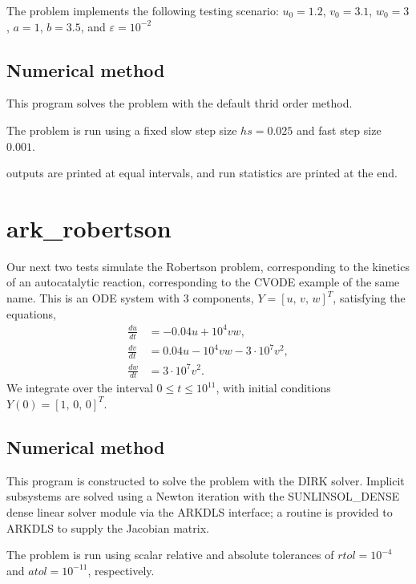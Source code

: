 \documentclass[letterpaper,10pt,english]{sphinxmanual}
\begin{document}
\sphinxAtStartPar
The problem implements the following testing scenario: \(u_0=1.2\),
\(v_0=3.1\),  \(w_0=3\), \(a=1\), \(b=3.5\), and
\(\varepsilon=10^{-2}\)


\subsection{Numerical method}
\label{\detokenize{c_serial:id11}}
\sphinxAtStartPar
This program solves the problem with the default thrid order method.

\sphinxAtStartPar
The problem is run using a fixed slow step size \(hs=0.025\) and fast step
size \(0.001\).

 outputs are printed at equal intervals, and run statistics
are printed at the end.


\section{ark\_robertson}
\label{\detokenize{c_serial:ark-robertson}}\label{\detokenize{c_serial:id12}}
\sphinxAtStartPar
Our next two tests simulate the Robertson problem, corresponding to the
kinetics of an autocatalytic reaction, corresponding to the CVODE
example of the same name.  This is an ODE system with 3
components, \(Y = [u,\, v,\, w]^T\), satisfying the equations,
\begin{equation*}
\begin{split}\frac{du}{dt} &= -0.04 u + 10^4 v w, \\
\frac{dv}{dt} &= 0.04 u - 10^4 v w - 3\cdot10^7 v^2, \\
\frac{dw}{dt} &= 3\cdot10^7 v^2.\end{split}
\end{equation*}
\sphinxAtStartPar
We integrate over the interval \(0\le t\le 10^{11}\), with initial
conditions  \(Y(0) = [1,\, 0,\, 0]^T\).


\subsection{Numerical method}
\label{\detokenize{c_serial:id13}}
\sphinxAtStartPar
This program is constructed to solve the problem with the DIRK solver.
Implicit subsystems are solved using a Newton iteration with the
SUNLINSOL\_DENSE dense linear solver module via the ARKDLS interface; a
routine is provided to ARKDLS to supply the Jacobian matrix.

\sphinxAtStartPar
The problem is run using scalar relative and absolute tolerances of
\(rtol=10^{-4}\) and \(atol=10^{-11}\), respectively.
\end{document}
